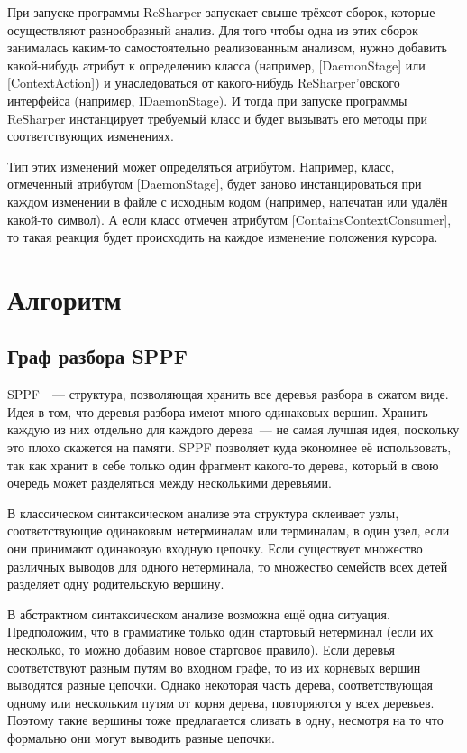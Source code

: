 При запуске программы ReSharper запускает свыше трёхсот сборок, которые осуществляют разнообразный анализ. Для того чтобы одна из этих сборок занималась каким-то самостоятельно реализованным анализом, нужно добавить какой-нибудь атрибут к определению класса (например, [DaemonStage] или [ContextAction]) и унаследоваться от какого-нибудь ReSharper’овского интерфейса (например, IDaemonStage). И тогда при запуске программы ReSharper инстанцирует требуемый класс и будет вызывать его методы при соответствующих изменениях. 

Тип этих изменений может определяться атрибутом. Например, класс, отмеченный атрибутом [DaemonStage], будет заново инстанцироваться при каждом изменении в файле с исходным кодом (например, напечатан или удалён какой-то символ). А если класс отмечен атрибутом [ContainsContextConsumer], то такая реакция будет происходить на каждое изменение положения курсора. 

\section{Алгоритм}
\subsection{Граф разбора SPPF}

SPPF~\cite{RNGLR}~--- структура, позволяющая хранить все деревья разбора в сжатом виде. Идея в том, что деревья разбора имеют много одинаковых вершин. Хранить каждую из них отдельно для каждого дерева~--- не самая лучшая идея, поскольку это плохо скажется на памяти. SPPF позволяет куда экономнее её использовать, так как хранит в себе только один фрагмент какого-то дерева, который в свою очередь может разделяться между несколькими деревьями. 

В классическом синтаксическом анализе эта структура склеивает узлы, соответствующие одинаковым нетерминалам или терминалам, в один  узел, если они принимают одинаковую входную цепочку. Если существует множество различных выводов для одного нетерминала, то множество семейств всех детей разделяет одну родительскую вершину. 

В абстрактном синтаксическом анализе возможна ещё одна ситуация. Предположим, что в грамматике только один стартовый нетерминал (если их несколько, то можно добавим новое стартовое правило). Если деревья соответствуют разным путям во входном графе, то из их корневых вершин выводятся разные цепочки. Однако некоторая часть дерева, соответствующая одному или нескольким путям от корня дерева, повторяются у всех деревьев. Поэтому такие вершины тоже предлагается сливать в одну, несмотря на то что формально они могут выводить разные цепочки. 

